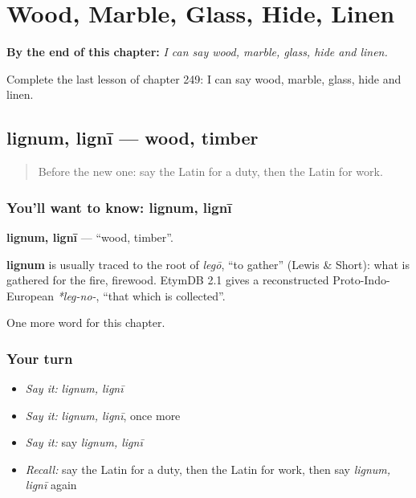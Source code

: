 
\chapter{Wood, Marble, Glass, Hide, Linen}
\label{ch:la-wood-marble-glass-hide-linen}

\begin{chapteropening}
\textbf{By the end of this chapter:} \emph{I can say wood, marble, glass, hide and linen.}

Complete the last lesson of chapter 249: I can say wood, marble, glass, hide and linen.
\end{chapteropening}

\section[lignum, lignī]{lignum, lignī — wood, timber}

\label{lesson:LA-C249-lignum}



\begin{quote}
Before the new one: say the Latin for a duty, then the Latin for work.
\end{quote}

\subsection*{You'll want to know: lignum, lignī}
\textbf{lignum, lignī} — \textquotedblleft{}wood, timber\textquotedblright{}.

\begin{cousinweb}
\textbf{lignum} is usually traced to the root of \emph{legō}, \textquotedblleft{}to gather\textquotedblright{} (Lewis \& Short): what is gathered for the fire, firewood. EtymDB 2.1 gives a reconstructed Proto-Indo-European \emph{*leg-no-}, \textquotedblleft{}that which is collected\textquotedblright{}.
\end{cousinweb}

\begin{grammarlens}[title={What you've built}]
One more word for this chapter.
\end{grammarlens}

\subsection*{Your turn}
\begin{itemize}
\raggedright
  \item \emph{Say it:} \emph{lignum, lignī}
  \item \emph{Say it:} \emph{lignum, lignī}, once more
  \item \emph{Say it:} say \emph{lignum, lignī}
  \item \emph{Recall:} say the Latin for a duty, then the Latin for work, then say \emph{lignum, lignī} again
\end{itemize}

